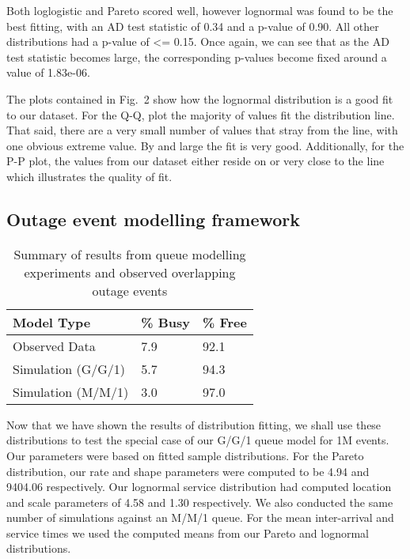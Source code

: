 \documentclass[5p]{elsarticle}
\begin{document}
Both loglogistic and Pareto scored well, however lognormal was found to be the best fitting, with an AD test statistic of 0.34 and a p-value of 0.90. All other distributions had a p-value of \textless= 0.15. Once again, we can see that as the AD test statistic becomes large, the corresponding p-values become fixed around a value of 1.83e-06.

The plots contained in Fig.~2 show how the lognormal distribution is a good fit to our dataset. For the Q-Q, plot the majority of values fit the distribution line. That said, there are a very small number of values that stray from the line, with one obvious extreme value. By and large the fit is very good. Additionally, for the P-P plot, the values from our dataset either reside on or very close to the line which illustrates the quality of fit.


\subsection{Outage event modelling framework}

\begin {table}[]
\caption {Summary of results from queue modelling experiments and observed overlapping outage events} 
\begin{center}
\begin{tabular}{l | l | l} \bf{Model Type} & \bf {\% Busy} & \bf {\% Free}
\\ \hline Observed Data & 7.9 &  92.1 
\\  Simulation (G/G/1) & 5.7 &  94.3 
\\  Simulation (M/M/1) & 3.0  &  97.0 
\\ \hline 
 \end{tabular}
\end{center}
\end{table}


Now that we have shown the results of distribution fitting, we shall use these distributions to test the special case of our G/G/1 queue model for 1M events. Our parameters were based on fitted sample distributions. For the Pareto distribution, our rate and shape parameters were computed to be 4.94 and 9404.06 respectively. Our lognormal service distribution had computed location and scale parameters of 4.58 and 1.30 respectively. We also conducted the same number of simulations against an M/M/1 queue. For the mean inter-arrival and service times we used the computed means from our Pareto and lognormal distributions.
\end{document}
